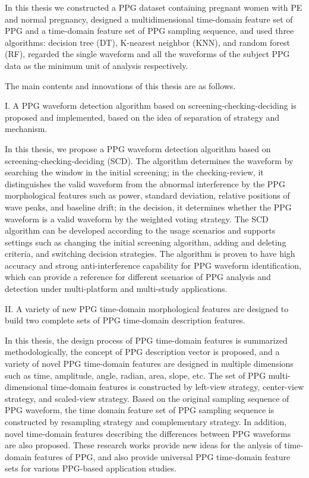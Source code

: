 In this thesis we constructed a PPG dataset containing pregnant women with PE and normal pregnancy, designed a multidimensional time-domain feature set of PPG and 
a time-domain feature set of PPG sampling sequence, and used three algorithms: decision tree (DT), K-nearest neighbor (KNN), and random forest (RF), 
regarded the single waveform and all the waveforms of the subject PPG data as the minimum unit of analysis respectively.

The main contents and innovations of this thesis are as follows.

I. A PPG waveform detection algorithm based on screening-checking-deciding is proposed and implemented, based on the idea of separation of strategy and mechanism.

In this thesis, we propose a PPG waveform detection algorithm based on screening-checking-deciding (SCD). The algorithm determines the waveform by searching the window 
in the initial screening; in the checking-review, it distinguishes the valid waveform from the abnormal interference by the PPG morphological features such as power, standard deviation, 
relative positions of wave peaks, and baseline drift; in the decision, it determines whether the PPG waveform is a valid waveform by the weighted voting strategy. 
The SCD algorithm can be developed according to the usage scenarios and supports settings such as changing the initial screening algorithm, adding and deleting criteria, 
and switching decision strategies. The algorithm is proven to have high accuracy and strong anti-interference capability for PPG waveform identification, 
which can provide a reference for different scenarios of PPG analysis and detection under multi-platform and multi-study applications.

II. A variety of new PPG time-domain morphological features are designed to build two complete sets of PPG time-domain description features.

In this thesis, the design process of PPG time-domain features is summarized methodologically, the concept of PPG description vector is proposed, 
and a variety of novel PPG time-domain features are designed in multiple dimensions such as time, amplitude, angle, radian, area, slope, etc. 
The set of PPG multi-dimensional time-domain features is constructed by left-view strategy, center-view strategy, and scaled-view strategy. 
Based on the original sampling sequence of PPG waveform, the time domain feature set of PPG sampling sequence is constructed by resampling strategy and 
complementary strategy. In addition, novel time-domain features describing the differences between PPG waveforms are also proposed. 
These research works provide new ideas for the anlysis of time-domain features of PPG, and also provide universal PPG time-domain feature sets for various PPG-based application studies.

